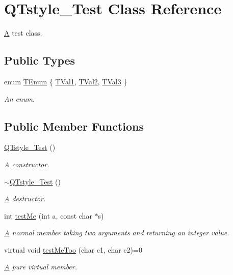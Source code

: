 \hypertarget{class_q_tstyle___test}{}\section{Q\+Tstyle\+\_\+\+Test Class Reference}
\label{class_q_tstyle___test}


\mbox{\hyperlink{class_a}{A}} test class.  


\subsection*{Public Types}
\begin{DoxyCompactItemize}
\item 
enum \mbox{\hyperlink{class_q_tstyle___test_a0525f798cda415a94fedeceb806d2c49}{T\+Enum}} \{ \mbox{\hyperlink{class_q_tstyle___test_a0525f798cda415a94fedeceb806d2c49a7929af91f99c319ffe2e49c9632bc3fa}{T\+Val1}}, 
\mbox{\hyperlink{class_q_tstyle___test_a0525f798cda415a94fedeceb806d2c49afff89db6859123549579806212d9fd80}{T\+Val2}}, 
\mbox{\hyperlink{class_q_tstyle___test_a0525f798cda415a94fedeceb806d2c49a8227cd0f0c1285d59ff14376fcd00f85}{T\+Val3}}
 \}
\begin{DoxyCompactList}\small\item\em An enum. \end{DoxyCompactList}\end{DoxyCompactItemize}
\subsection*{Public Member Functions}
\begin{DoxyCompactItemize}
\item 
\mbox{\hyperlink{class_q_tstyle___test_a14a296ea4e2ad446712f2310bec60766}{Q\+Tstyle\+\_\+\+Test}} ()
\begin{DoxyCompactList}\small\item\em \mbox{\hyperlink{class_a}{A}} constructor. \end{DoxyCompactList}\item 
\mbox{\hyperlink{class_q_tstyle___test_a7e82397d534d9a867f0857da01a46e9e}{$\sim$\+Q\+Tstyle\+\_\+\+Test}} ()
\begin{DoxyCompactList}\small\item\em \mbox{\hyperlink{class_a}{A}} destructor. \end{DoxyCompactList}\item 
int \mbox{\hyperlink{class_q_tstyle___test_a8840748753118dd468e8368a28e49c62}{test\+Me}} (int a, const char $\ast$s)
\begin{DoxyCompactList}\small\item\em \mbox{\hyperlink{class_a}{A}} normal member taking two arguments and returning an integer value. \end{DoxyCompactList}\item 
virtual void \mbox{\hyperlink{class_q_tstyle___test_ad5b201f097a720d44bf976c2f27efbda}{test\+Me\+Too}} (char c1, char c2)=0
\begin{DoxyCompactList}\small\item\em \mbox{\hyperlink{class_a}{A}} pure virtual member. \end{DoxyCompactList}\end{DoxyCompactItemize}
